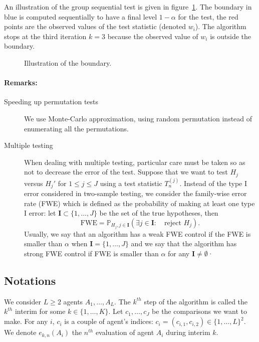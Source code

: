 \documentclass{article}
\theoremstyle{plain}
\theoremstyle{remark}
\renewcommand{\P}{\mathbb{P}}
\newcommand{\1}{\mathbbm{1}}
\numberwithin{equation}{section}
\begin{document}
An illustration of the group sequential test is given in figure~\ref{fig:gst}. The boundary in blue is computed sequentially to have a final level $1-\alpha$ for the test, the red points are the observed values of the test statistic (denoted $w_i$). The algorithm stops at the third iteration $k=3$ because the observed value of $w_i$ is outside the boundary.

\begin{figure}
\begin{center}

\caption{Illustration of the boundary.\label{fig:gst}}
\end{center}
\end{figure}


\paragraph{Remarks:}
\begin{description}
\item[Speeding up permutation tests]
We use Monte-Carlo approximation, using random permutation instead of enumerating all the permutations.

\item[Multiple testing]
When dealing with multiple testing, particular care must be taken so as not to decrease the error of the test. Suppose that we want to test $H_j$ versus $H_j'$ for $1\le j\le J$ using a test statistic $T_{n}^{(j)}$. Instead of the type I error considered in two-sample testing, we consider the family-wise error rate (FWE) which is defined as the probability of making at least one type I error: let $\textbf{I}\subset \{1,\dots,J\}$ be the set of the true hypotheses, then 
$$\mathrm{FWE} = \P_{H_j, j \in \textbf{I}}\left(\exists j \in \textbf{I}:\quad  \text{reject }H_j \right).$$
Usually, we say that an algorithm has a weak FWE control if the FWE is smaller than $\alpha$ when $\textbf{I}=\{1,\dots,J\}$ and we say that the algorithm has strong FWE control if FWE is smaller than $\alpha$ for any $\textbf{I}\neq \emptyset$· 
\end{description}

\subsection{Notations}
We consider $L\ge 2$ agents $A_1,\dots,A_L$. The $k^{th}$ step of the algorithm is called the $k^{th}$ interim for some $k \in \{1,\dots,K\}$. Let $c_1,\dots,c_J$ be the comparisons we want to make. For any $i$, $c_i$ is a couple of agent's indices: $c_i=(c_{i,1},c_{i,2}) \in \{1,\dots,L\}^2$. We denote $e_{k,n}(A_i)$ the $n^{th}$ evaluation of agent $A_i$ during interim $k$.
\end{document}
